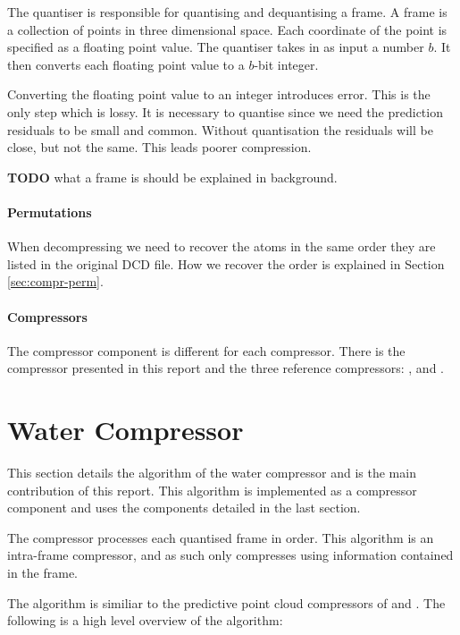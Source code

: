 \documentclass{report}
\newcommand{\todo}{\textbf{TODO} }
\begin{document}
The quantiser is responsible for quantising and dequantising a frame. A frame
is a collection of points in three dimensional space. Each coordinate of the
point is specified as a floating point value. The quantiser takes in as input
a number $b$. It then converts each floating point value to a $b$-bit integer.

Converting the floating point value to an integer introduces error. This is
the only step which is lossy. It is necessary to quantise since we need the
prediction residuals to be small and common. Without quantisation the
residuals will be close, but not the same. This leads poorer compression.

\todo what a frame is should be explained in background.


\paragraph{Permutations}

When decompressing we need to recover the atoms in the same order they are
listed in the original DCD file. How we recover the order is explained in
Section \ref{sec:compr-perm}.


\paragraph{Compressors}

The compressor component is different for each compressor. There is the
compressor presented in this report and the three reference compressors:
\citet{omeltchenko2000sls}, \citet{gumholdcomp} and \citet{devillers2000gci}.


\section{Water Compressor}

This section details the algorithm of the water compressor and is the main
contribution of this report. This algorithm is implemented as a compressor
component and uses the components detailed in the last section.

The compressor processes each quantised frame in order. This algorithm is an
intra-frame compressor, and as such only compresses using information
contained in the frame.

The algorithm is similiar to the predictive point cloud compressors of
\citep{gumholdcomp} and \citep{merrycomp}. The following is a high level
overview of the algorithm:
\end{document}
